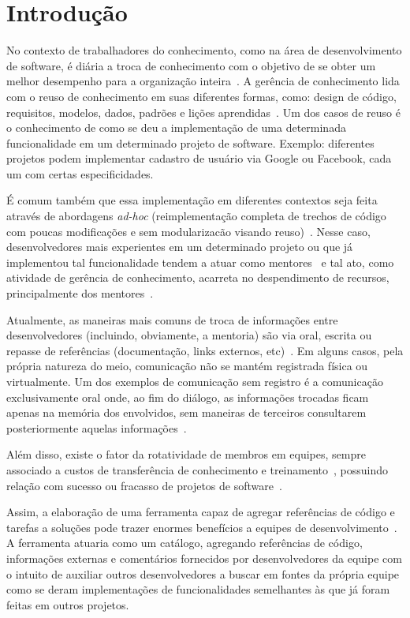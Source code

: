 \chapter{Introdução}

No contexto de trabalhadores do conhecimento, como na área de desenvolvimento de software, é diária a troca de conhecimento com o objetivo de se obter um melhor desempenho para a organização inteira~\cite{Druker1993, Wiig2003}. A gerência de conhecimento lida com o reuso de conhecimento em  suas diferentes formas, como: design de código, requisitos, modelos, dados, padrões e lições aprendidas~\cite{Levy2009}. Um dos casos de reuso é o conhecimento de como se deu a implementação de uma determinada funcionalidade em um determinado projeto de software. Exemplo: diferentes projetos podem implementar cadastro de usuário via Google ou Facebook, cada um com certas especificidades.

É comum também que essa implementação em diferentes contextos seja feita através de abordagens \textit{ad-hoc} (reimplementação completa de trechos de código com poucas modificações e sem modularizacão visando reuso)~\cite{SangMok2011}. Nesse caso, desenvolvedores mais experientes em um determinado projeto ou que já implementou tal funcionalidade tendem a atuar como mentores~\cite{CubraniC2004} e tal ato, como atividade de gerência de conhecimento, acarreta no despendimento de recursos, principalmente dos mentores~\cite{Wiig2003}. 

Atualmente, as maneiras mais comuns de troca de informações entre desenvolvedores (incluindo, obviamente, a mentoria) são via oral, escrita ou repasse de referências (documentação, links externos, etc)~\cite{Storey2014, Olson2000, CubraniC2004}. Em alguns casos, pela própria natureza do meio, comunicação não se mantém registrada física ou virtualmente. Um dos exemplos de comunicação sem registro é a comunicação exclusivamente oral onde, ao fim do diálogo, as informações trocadas ficam apenas na memória dos envolvidos, sem maneiras de terceiros consultarem posteriormente aquelas informações~\cite{Olson2000}. 

Além disso, existe o fator da rotatividade de membros em equipes, sempre associado a custos de transferência de conhecimento e treinamento~\cite{Hall2008}, possuindo relação com sucesso ou fracasso de projetos de software~\cite{Hall2008}. 

Assim, a elaboração de uma ferramenta capaz de agregar referências de código e tarefas a soluções pode trazer enormes benefícios a equipes de desenvolvimento~\cite{CubraniC2004}. A ferramenta atuaria como um catálogo, agregando referências de código, informações externas e comentários fornecidos por desenvolvedores da equipe com o intuito de auxiliar outros desenvolvedores a buscar em fontes da própria equipe como se deram implementações de funcionalidades semelhantes às que já foram feitas em outros projetos.

